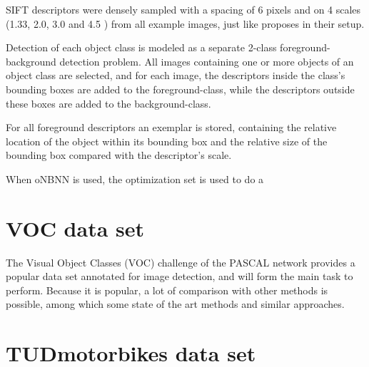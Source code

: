 SIFT descriptors were densely sampled with a spacing of 6 pixels and on 4 scales (1.33, 2.0, 3.0 and 4.5 ) from all example images, just like \cite{mccann2011local} proposes in their setup. 


Detection of each object class is modeled as a separate 2-class foreground-background detection problem. All images containing one or more objects of an object class are selected, and for each image, the descriptors inside the class's bounding boxes are added to the foreground-class, while the descriptors outside these boxes are added to the background-class.

For all foreground descriptors an exemplar is stored, containing the relative location of the object within its bounding box and the relative size of the bounding box compared with the descriptor's scale.

When oNBNN is used, the optimization set is used to do a 

\section{VOC data set} %

\label{sub:voc_data_set}
The Visual Object Classes (VOC) challenge of the PASCAL network  provides a popular data set annotated for image detection, and will form the main task to perform. Because it is popular, a lot of comparison with other methods is possible, among which some state of the art methods and similar approaches.


\section{TUDmotorbikes data set} %
\label{sub:tudmotorbikes_data_set}


